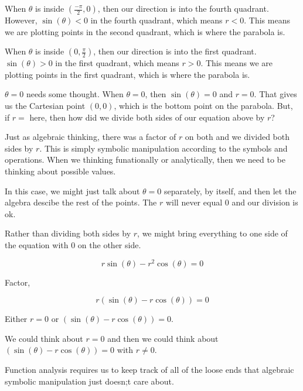 \documentclass{ximera}
\begin{document}
\begin{warning}
      When $\theta$ is inside $\left( \frac{-\pi}{2}, 0 \right)$, then our direction is into the fourth quadrant.  However, $\sin(\theta) < 0$ in the fourth quadrant, which means $r < 0$.  This means we are plotting points in the second quadrant, which is where the parabola is.


      When $\theta$ is inside $\left( 0, \frac{\pi}{2} \right)$, then our direction is into the first quadrant.   $\sin(\theta) > 0$ in the first quadrant, which means $r > 0$.  This means we are plotting points in the first quadrant, which is where the parabola is.


      $\theta = 0$ needs some thought.  When $\theta = 0$, then $\sin(\theta) = 0$ and $r = 0$.  That gives us the Cartesian point $(0,0)$, which is the bottom point on the parabola.  But, if $r =$ here, then how did we divide both sides of our equation above by $r$?

      Just as algebraic thinking, there was a factor of $r$ on both and we divided both sides by $r$.  This is simply symbolic manipulation according to the symbols and operations.  When we thinking funationally or analytically, then we need to be thinking about possible values.

      In this case, we might just talk about $\theta = 0$ separately, by itself, and then let the algebra descibe the rest of the points.  The $r$ will never equal $0$ and our division is ok.
\end{warning}







\begin{idea}  



Rather than dividing both sides by $r$, we might bring everything to one side of the equation with $0$ on the other side.



\[ r \sin(\theta) - r^2 \cos(\theta) = 0   \]


Factor, 

\[ r (\sin(\theta) - r \cos(\theta)) = 0   \]



Either $r = 0$ or $(\sin(\theta) - r \cos(\theta)) = 0$.

We could think about $r=0$ and then we could think about $(\sin(\theta) - r \cos(\theta)) = 0$ with $r \ne 0$.


Function analysis requires us to keep track of all of the loose ends that algebraic symbolic manipulation just doesn;t care about.



\end{idea}
\end{document}
